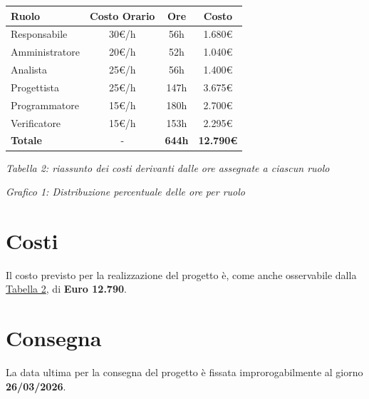\documentclass[a4paper,11pt]{article}
\begin{document}
{\footnotesize
\begin{center}
\label{tab:costi-ruoli}
\begin{tabular}{|l|c|c|c|}
\hline
\textbf{Ruolo} & \textbf{Costo Orario} & \textbf{Ore} & \textbf{Costo} \\
\hline
Responsabile & 30€/h & 56h & 1.680€ \\
Amministratore & 20€/h & 52h & 1.040€ \\
Analista & 25€/h & 56h & 1.400€ \\
Progettista & 25€/h & 147h & 3.675€ \\
Programmatore & 15€/h & 180h & 2.700€ \\
Verificatore & 15€/h & 153h & 2.295€ \\
\hline
\textbf{Totale} & - & \textbf{644h} & \textbf{12.790€} \\
\hline
\end{tabular}
\end{center}
}

\begin{center}
\textit{Tabella 2: riassunto dei costi derivanti dalle ore assegnate a ciascun ruolo}
\end{center}

\vspace{1cm}

\begin{center}
\end{center}

\begin{center}
\textit{Grafico 1: Distribuzione percentuale delle ore per ruolo}
\end{center}

\newpage

\section{Costi}
Il costo previsto per la realizzazione del progetto è, come anche osservabile dalla \hyperref[tab:costi-ruoli]{\textcolor{secondaryblue}{Tabella 2}}, di \textbf{Euro 12.790}.

\section{Consegna}
La data ultima per la consegna del progetto è fissata improrogabilmente al giorno \textbf{26/03/2026}.
\end{document}
